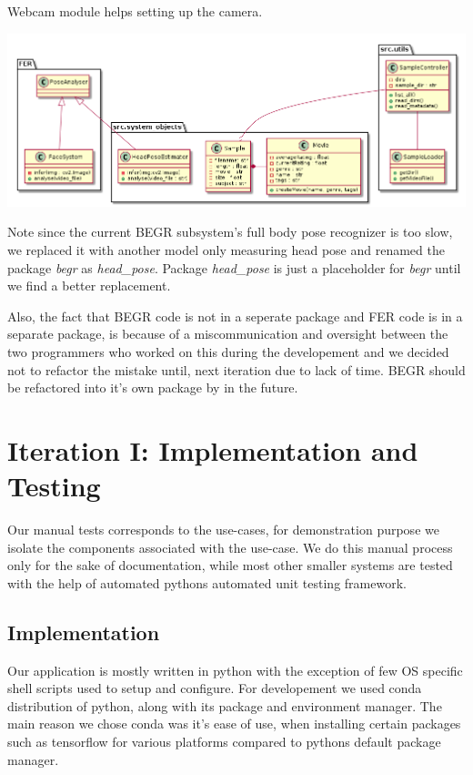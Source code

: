 \documentclass[12pt,a4paper,man]{report}
\begin{document}
Webcam module helps setting up the camera.


\begin{center}
\includegraphics[width=.9\linewidth]{img/class2.png}
\end{center}

Note since the current BEGR subsystem's full body pose recognizer is too slow, we replaced it with another model only measuring head pose and renamed the package \emph{begr} as \emph{head\_pose}. Package \emph{head\_pose} is just a placeholder for \emph{begr} until we find a better replacement. 

Also, the fact that BEGR code is not in a seperate package and FER code is in a separate package, is because of a miscommunication and oversight between the two programmers who worked on this during the developement and we decided not to refactor the mistake until, next iteration due to lack of time. BEGR should be refactored into it's own package by in the future.

\chapter{Iteration I: Implementation and Testing}
\label{sec:org2629943}

Our manual tests corresponds to the use-cases, for demonstration purpose we isolate the components associated with the use-case. We do this manual process only for the sake of documentation, while most other smaller systems are tested with the help of automated pythons automated unit testing framework.

\section{Implementation}
\label{sec:org17b630e}
Our application is mostly written in python with the exception of few OS specific shell scripts used to setup and configure. For developement we used conda distribution of python, along with its package and environment manager. The main reason we chose conda was it's ease of use, when installing certain packages such as tensorflow for various platforms compared to pythons default package manager.
\end{document}

